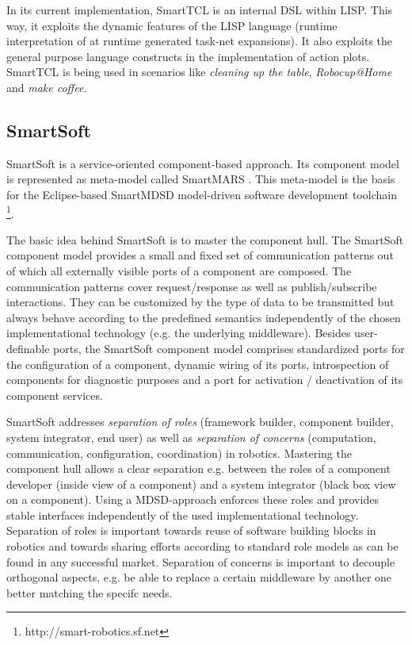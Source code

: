 \documentclass[jou]{apa}
\begin{document}
In its current implementation, {\sc SmartTCL} is an internal DSL within LISP. This way, it
exploits the dynamic features of the LISP language (runtime interpretation of at runtime generated
task-net expansions). It also exploits the general purpose language constructs in the implementation
of action plots. {\sc SmartTCL} is being used in scenarios like {\em cleaning up the table},
{\em Robocup@Home} and {\em make coffee}.

\subsection{SmartSoft}

{\sc SmartSoft} \cite{schlegel-jars, schlegel-star} is a service-oriented 
component-based approach. Its component model is represented as meta-model 
called {\sc SmartMARS} \cite{Schlegel2009}. This meta-model is the basis for 
the Eclipse-based {\sc SmartMDSD} model-driven software development toolchain
\footnote{http://smart-robotics.sf.net}.

The basic idea behind {\sc SmartSoft} is to master the component hull. The {\sc SmartSoft} 
component model provides a small and fixed set of communication patterns out of which all 
externally visible ports of a component are composed. The communication patterns cover 
request/response as well as publish/subscribe interactions. They can be customized by 
the type of data to be transmitted but always behave according to the predefined semantics
independently of the chosen implementational technology (e.g. the underlying middleware). 
Besides user-definable ports, the {\sc SmartSoft} component model comprises standardized 
ports for the configuration of a component, dynamic wiring of its ports, introspection of 
components for diagnostic purposes and a port for activation / deactivation of its component 
services.

{\sc SmartSoft} addresses {\em separation of roles} (framework builder, component builder, 
system integrator, end user) as well as {\em separation of concerns} (computation, communication,
configuration, coordination) in robotics. Mastering the component hull allows a clear separation 
e.g. between the roles of a component developer (inside view of a component) and a system integrator 
(black box view on a component). Using a MDSD-approach enforces these roles and provides stable 
interfaces independently of the used implementational technology. Separation of roles is important 
towards reuse of software building blocks in robotics and towards sharing efforts according to 
standard role models as can be found in any successful market. Separation of concerns is important
to decouple orthogonal aspects, e.g. be able to replace a certain middleware by another one better
matching the specifc needs.
\end{document}
